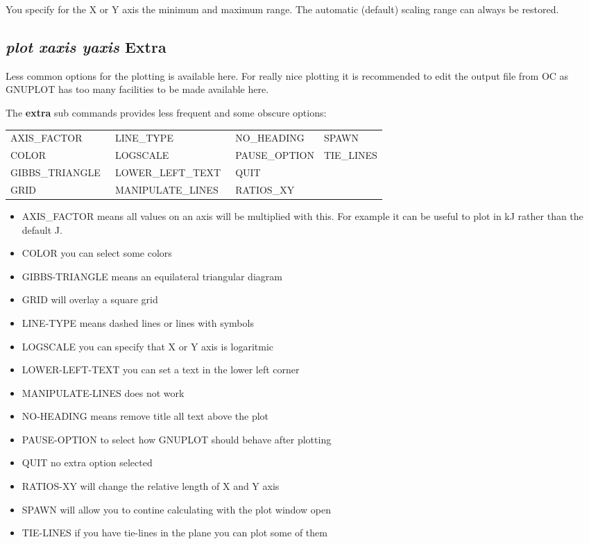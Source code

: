 \documentclass[11pt]{article}
\begin{document}
You specify for the X or Y axis the minimum and maximum range.  The
automatic (default) scaling range can always be restored.

\hypertarget{Plot extra}{}
\hypertarget{Extra Gibbs_triangle}{}
\subsection{{\em plot xaxis yaxis} Extra }

Less common options for the plotting is available here.  For really
nice plotting it is recommended to edit the output file from
OC as GNUPLOT has too many facilities to be made available here.

\hypertarget{Extra options}{} The {\bf extra} sub commands provides
less frequent and some obscure options:

{\small
\begin{tabular}{llll}
AXIS\_FACTOR     & LINE\_TYPE         & NO\_HEADING   & SPAWN       \\
COLOR            & LOGSCALE           & PAUSE\_OPTION & TIE\_LINES \\
GIBBS\_TRIANGLE~ & LOWER\_LEFT\_TEXT~ & QUIT        \\
GRID             & MANIPULATE\_LINES~ & RATIOS\_XY  \\
\end{tabular}
}

\begin{itemize}
\item AXIS\_FACTOR means all values on an axis will be multiplied with
  this.  For example it can be useful to plot in kJ rather than the default J.
\item COLOR you can select some colors
\item GIBBS-TRIANGLE means an equilateral triangular diagram
\item GRID will overlay a square grid
\item LINE-TYPE means dashed lines or lines with symbols
\item LOGSCALE you can specify that X or Y axis is logaritmic
\item LOWER-LEFT-TEXT you can set a text in the lower left corner
\item MANIPULATE-LINES does not work
\item NO-HEADING means remove title all text above the plot
\item PAUSE-OPTION to select how GNUPLOT should behave after plotting
\item QUIT no extra option selected
\item RATIOS-XY will change the relative length of X and Y axis
\item SPAWN will allow you to contine calculating with the plot window open
\item TIE-LINES if you have tie-lines in the plane you can plot some of them
\end{itemize}
\end{document}
